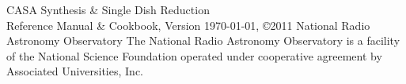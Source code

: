 
\begin{center}
{\sc CASA Synthesis \& Single Dish Reduction\\ Reference Manual \& Cookbook}, 
\break
Version \today,
\break
\copyright 2011 National Radio Astronomy Observatory
\break
\break
The National Radio Astronomy Observatory is a facility of the National
Science Foundation operated under cooperative agreement by Associated
Universities, Inc.\\[1cm]
\end{center}

%
%



\pagebreak
~
\pagebreak